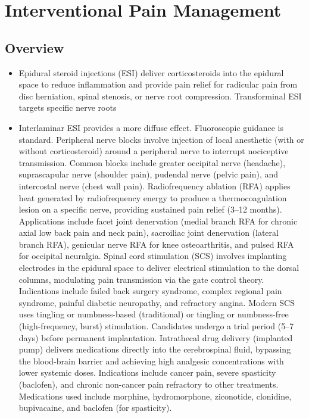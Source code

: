 \chapter{Interventional Pain Management}
\label{sec:Interventional Pain Management}

\section{Overview}


\begin{itemize}[noitemsep]
  \item Epidural steroid injections (ESI) deliver corticosteroids into the epidural space to reduce inflammation and provide pain relief for radicular pain from disc herniation, spinal stenosis, or nerve root compression. Transforminal ESI targets specific nerve roots
  \item Interlaminar ESI provides a more diffuse effect. Fluoroscopic guidance is standard. Peripheral nerve blocks involve injection of local anesthetic (with or without corticosteroid) around a peripheral nerve to interrupt nociceptive transmission. Common blocks include greater occipital nerve (headache), suprascapular nerve (shoulder pain), pudendal nerve (pelvic pain), and intercostal nerve (chest wall pain). Radiofrequency ablation (RFA) applies heat generated by radiofrequency energy to produce a thermocoagulation lesion on a specific nerve, providing sustained pain relief (3--12 months). Applications include facet joint denervation (medial branch RFA for chronic axial low back pain and neck pain), sacroiliac joint denervation (lateral branch RFA), genicular nerve RFA for knee osteoarthritis, and pulsed RFA for occipital neuralgia. Spinal cord stimulation (SCS) involves implanting electrodes in the epidural space to deliver electrical stimulation to the dorsal columns, modulating pain transmission via the gate control theory. Indications include failed back surgery syndrome, complex regional pain syndrome, painful diabetic neuropathy, and refractory angina. Modern SCS uses tingling or numbness-based (traditional) or tingling or numbness-free (high-frequency, burst) stimulation. Candidates undergo a trial period (5--7 days) before permanent implantation. Intrathecal drug delivery (implanted pump) delivers medications directly into the cerebrospinal fluid, bypassing the blood-brain barrier and achieving high analgesic concentrations with lower systemic doses. Indications include cancer pain, severe spasticity (baclofen), and chronic non-cancer pain refractory to other treatments. Medications used include morphine, hydromorphone, ziconotide, clonidine, bupivacaine, and baclofen (for spasticity).
\end{itemize}
